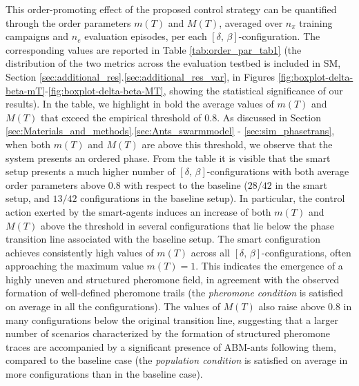 \documentclass[openacc]{rsproca_new}
\begin{document}
This order-promoting effect of the proposed control strategy can be quantified through the order parameters $m(T)$ and $M(T)$, averaged over $n_{\pi}$ training campaigns and $n_{e}$ evaluation episodes, per each $\left[ \delta, \, \beta \right]$-configuration. The corresponding values are reported in Table \ref{tab:order_par_tab1} (the distribution of the two metrics across the evaluation testbed is included in SM, Section \ref{sec:additional_res}.\ref{sec:additional_res_var}, in Figures \ref{fig:boxplot-delta-beta-mT}-\ref{fig:boxplot-delta-beta-MT}, showing the statistical significance of our results). In the table, we highlight in bold the average values of $m(T)$ and $M(T)$ that exceed the empirical threshold of $0.8$. As discussed in Section \ref{sec:Materials_and_methods}.\ref{sec:Ants_swarmmodel} - \ref{sec:sim_phasetrans}, when both $m(T)$ and $M(T)$ are above this threshold, we observe that the system presents an ordered phase. From the table it is visible that the smart setup presents a much higher number of $\left[ \delta, \, \beta \right]$-configurations with both average order parameters above $0.8$ with respect to the baseline ($28/42$ in the smart setup, and $13/42$ configurations in the baseline setup). In particular, the control action exerted by the smart-agents induces an increase of both $m(T)$ and $M(T)$ above the threshold in several configurations that lie below the phase transition line associated with the baseline setup. The smart configuration achieves consistently high values of $m(T)$ across all $\left[ \delta, \, \beta \right]$-configurations, often approaching the maximum value $m(T)=1$. This indicates the emergence of a highly uneven and structured pheromone field, in agreement with the observed formation of well-defined pheromone trails (the \textit{pheromone condition} is satisfied on average in all the configurations). The values of $M(T)$ also raise above $0.8$ in many configurations below the original transition line, suggesting that a larger number of scenarios characterized by the formation of structured pheromone traces are accompanied by a significant presence of ABM-ants following them, compared to the baseline case (the \textit{population condition} is satisfied on average in more configurations than in the baseline case). 
\end{document}
